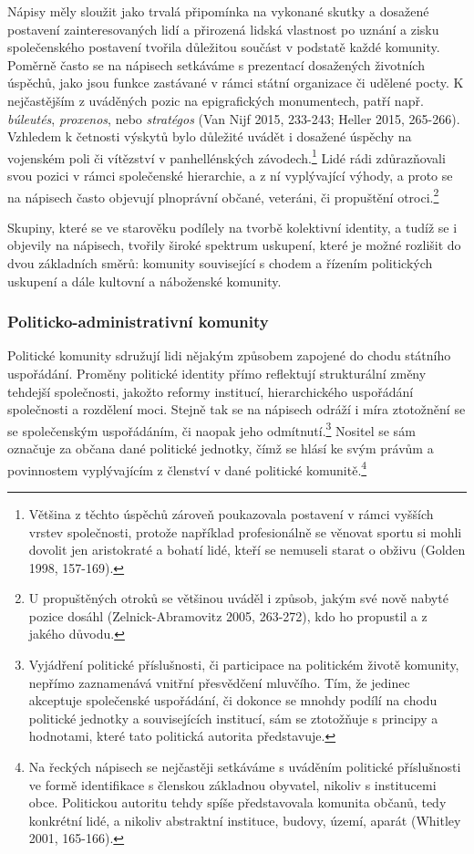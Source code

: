 Nápisy měly sloužit jako trvalá připomínka na vykonané skutky a dosažené postavení zainteresovaných lidí a přirozená lidská vlastnost po uznání a zisku společenského postavení tvořila důležitou součást v podstatě každé komunity. Poměrně často se na nápisech setkáváme s prezentací dosažených životních úspěchů, jako jsou funkce zastávané v rámci státní organizace či udělené pocty. K nejčastějším z uváděných pozic na epigrafických monumentech, patří např. {\em búleutés}, {\em proxenos}, nebo {\em stratégos} (Van Nijf 2015, 233-243; Heller 2015, 265-266). Vzhledem k četnosti výskytů bylo důležité uvádět i dosažené úspěchy na vojenském poli či vítězství v panhellénských závodech.\footnote{Většina z těchto úspěchů zároveň poukazovala postavení v rámci vyšších vrstev společnosti, protože například profesionálně se věnovat sportu si mohli dovolit jen aristokraté a bohatí lidé, kteří se nemuseli starat o obživu (Golden 1998, 157-169).} Lidé rádi zdůrazňovali svou pozici v rámci společenské hierarchie, a z ní vyplývající výhody, a proto se na nápisech často objevují plnoprávní občané, veteráni, či propuštění otroci.\footnote{U propuštěných otroků se většinou uváděl i způsob, jakým své nově nabyté pozice dosáhl (Zelnick-Abramovitz 2005, 263-272), kdo ho propustil a z jakého důvodu.}

Skupiny, které se ve starověku podílely na tvorbě kolektivní identity, a tudíž se i objevily na nápisech, tvořily široké spektrum uskupení, které je možné rozlišit do dvou základních směrů: komunity související s chodem a řízením politických uskupení a dále kultovní a náboženské komunity.

\subsubsection[politicko-administrativní-komunity]{Politicko-administrativní komunity}

Politické komunity sdružují lidi nějakým způsobem zapojené do chodu státního uspořádání. Proměny politické identity přímo reflektují strukturální změny tehdejší společnosti, jakožto reformy institucí, hierarchického uspořádání společnosti a rozdělení moci. Stejně tak se na nápisech odráží i míra ztotožnění se se společenským uspořádáním, či naopak jeho odmítnutí.\footnote{Vyjádření politické příslušnosti, či participace na politickém životě komunity, nepřímo zaznamenává vnitřní přesvědčení mluvčího. Tím, že jedinec akceptuje společenské uspořádání, či dokonce se mnohdy podílí na chodu politické jednotky a souvisejících institucí, sám se ztotožňuje s principy a hodnotami, které tato politická autorita představuje.} Nositel se sám označuje za občana dané politické jednotky, čímž se hlásí ke svým právům a povinnostem vyplývajícím z členství v dané politické komunitě.\footnote{Na řeckých nápisech se nejčastěji setkáváme s uváděním politické příslušnosti ve formě identifikace s členskou základnou obyvatel, nikoliv s institucemi obce. Politickou autoritu tehdy spíše představovala komunita občanů, tedy konkrétní lidé, a nikoliv abstraktní instituce, budovy, území, aparát (Whitley 2001, 165-166).}

